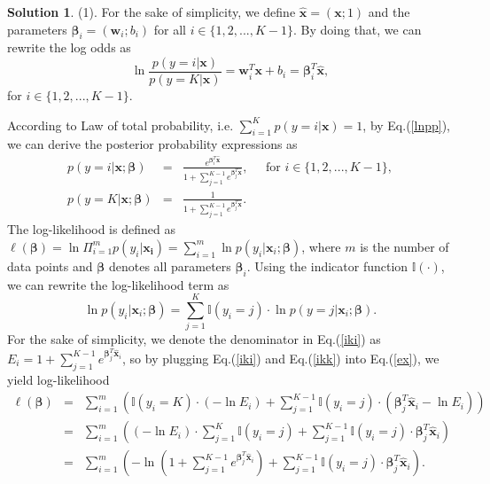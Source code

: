 \documentclass[a4paper,UTF8]{article}
\numberwithin{equation}{section}
\theoremstyle{definition}
\newtheorem*{solution}{Solution}
\begin{document}
\begin{solution}
\item[(1).] For the sake of simplicity, we define $\bm{\hat{x}}=(\bm{x}; 1)$ and the parameters $\bm{\beta}_i=(\bm{w}_i;b_i)$ for all $i\in\{1,2,...,K-1\}$. By doing that, we can rewrite the log odds as
\begin{equation}\label{lnpp}
\ln\frac{p(y=i|\bm{x})}{p(y=K|\bm{x})}=\bm{w}_i^T\bm{x}+b_i=\bm{\beta}_i^T\bm{\hat{x}},
\end{equation}
for $i\in\{1,2,...,K-1\}$.

According to Law of total probability, i.e. $\sum_{i=1}^Kp(y=i|\bm{x})=1$, by Eq.(\ref{lnpp}), we can derive the posterior probability expressions as
\begin{eqnarray}
p(y=i|\bm{x};\bm{\beta})&=&\frac{e^{\bm{\beta}_i^T\bm{\hat{x}}}}{1+\sum_{j=1}^{K-1}e^{\bm{\beta}_j^T\bm{\hat{x}}}}, \;\;\;\;\; \text{for }i\in\{1,2,...,K-1\},\label{iki} \\
p(y=K|\bm{x};\bm{\beta})&=&\frac{1}{1+\sum_{j=1}^{K-1}e^{\bm{\beta}_j^T\bm{\hat{x}}}}.\label{ikk}
\end{eqnarray}
The log-likelihood is defined as $\ell(\bm{\beta})=\ln\Pi_{i=1}^mp(y_i|\bm{x_i})=\sum_{i=1}^m\ln p(y_i|\bm{x}_i;\bm{\beta})$, where $m$ is the number of data points and $\bm{\beta}$ denotes all parameters $\bm{\beta}_i$. Using the indicator function $\mathbb{I}(\cdot)$, we can rewrite the log-likelihood term as
\begin{equation}\label{ex}
\ln p(y_i|\bm{x}_i;\bm{\beta})=\sum_{j=1}^K\mathbb{I}(y_i=j)\cdot\ln p(y=j|\bm{x}_i;\bm{\beta}).
\end{equation}
For the sake of simplicity, we denote the denominator in Eq.(\ref{iki}) as $E_i=1+\sum_{j=1}^{K-1}e^{\bm{\beta}_j^T\bm{\hat{x}}_i}$, so by plugging Eq.(\ref{iki}) and Eq.(\ref{ikk}) into Eq.(\ref{ex}), we yield log-likelihood
\begin{eqnarray}
\ell(\bm{\beta})&=&\sum_{i=1}^m\left(\mathbb{I}(y_i=K)\cdot(-\ln E_i)+\sum_{j=1}^{K-1}\mathbb{I}(y_i=j)\cdot(\bm{\beta}_j^T\bm{\hat{x}}_i-\ln E_i)\right) \nonumber\\
&=&\sum_{i=1}^m\left((-\ln E_i)\cdot\sum_{j=1}^{K}\mathbb{I}(y_i=j)+\sum_{j=1}^{K-1}\mathbb{I}(y_i=j)\cdot \bm{\beta}_j^T\bm{\hat{x}}_i\right)\nonumber\\
&=&\sum_{i=1}^m\left(-\ln(1+\sum_{j=1}^{K-1}e^{\bm{\beta}_j^T\bm{\hat{x}}_i})+\sum_{j=1}^{K-1}\mathbb{I}(y_i=j)\cdot \bm{\beta}_j^T\bm{\hat{x}}_i\right).
\end{eqnarray}


\end{solution}
\end{document}
